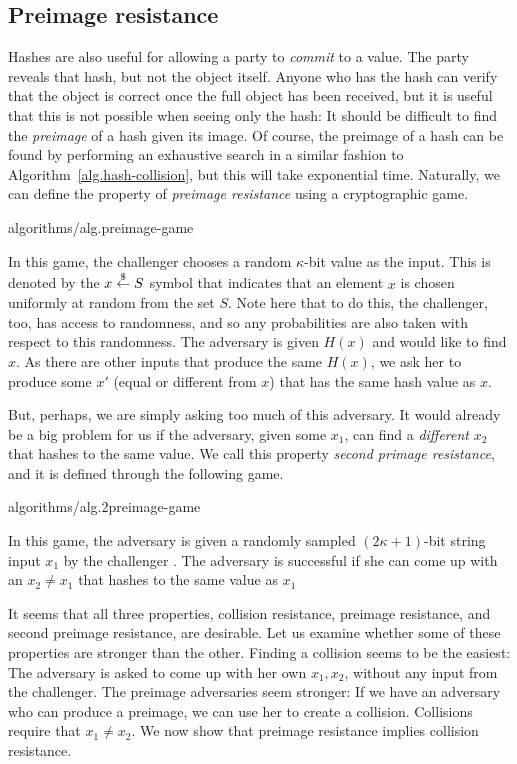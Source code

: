 \subsection*{Preimage resistance}

Hashes are also useful for allowing a party to \emph{commit} to a value. The party
reveals that hash, but not the object itself. Anyone who has the hash can verify that
the object is correct once the full object has been received, but it is useful that
this is not possible when seeing only the hash: It should be difficult to find the
\emph{preimage} of a hash given its image. Of course, the preimage of a hash can
be found by performing an exhaustive search in a similar fashion to
Algorithm~\ref{alg.hash-collision}, but this will take exponential time.
Naturally, we can define the property of \emph{preimage resistance} using a
cryptographic game.

{algorithms/alg.preimage-game}

In this game, the challenger chooses a random $\kappa$-bit value as the input. This is denoted by
the $x \overset{\$}{\gets} S$ symbol that indicates that an element $x$ is chosen uniformly at random
from the set $S$. Note here that to do this, the challenger, too, has access to randomness,
and so any probabilities are also taken with respect to this randomness.
The adversary is given $H(x)$ and would like to find $x$.
As there are other inputs that produce the same $H(x)$,
we ask her to produce some $x'$ (equal or different from $x$) that has the same hash value
as $x$.

But, perhaps, we are simply asking too much of this adversary. It would already be a big problem
for us if the adversary, given some $x_1$, can find a \emph{different} $x_2$ that hashes to the same
value. We call this property \emph{second primage resistance}, and it is defined through the following
game.

{algorithms/alg.2preimage-game}

In this game, the adversary is given a randomly sampled $(2\kappa+1)$-bit string input $x_1$ by the challenger .
The adversary is successful if she can come up with an $x_2 \neq x_1$ that hashes to the same value as $x_1$

It seems that all three properties, collision resistance, preimage resistance, and second preimage
resistance, are desirable. Let us examine whether some of these properties are stronger than the other.
Finding a collision seems to be the easiest: The adversary is asked to come up with her own $x_1, x_2$,
without any input from the challenger. The preimage adversaries seem stronger: If we have
an adversary who can produce a preimage, we can use her to create a collision. Collisions require
that $x_1 \neq x_2$. We now show that preimage resistance implies collision resistance.

